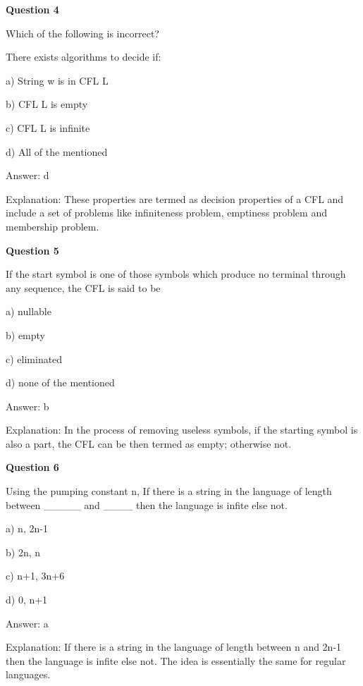 \documentclass{article}
\begin{document}
\begin{mdframed}[linewidth=1pt, roundcorner=5pt, linecolor=gray!30, backgroundcolor=gray!5]
\textbf{Question 4} 

Which of the following is incorrect?

There exists algorithms to decide if:

a) String w is in CFL L

b) CFL L is empty

c) CFL L is infinite

d) All of the mentioned
\vspace{5pt} \par
\begin{tcolorbox}[colback=green!5, colframe=green!40!black, title=Solution]
Answer: d

Explanation: These properties are termed as decision properties of a CFL and include a set of problems like infiniteness problem, emptiness problem and membership problem.
\end{tcolorbox}
\end{mdframed}

\begin{mdframed}[linewidth=1pt, roundcorner=5pt, linecolor=gray!30, backgroundcolor=gray!5]
\textbf{Question 5} 

If the start symbol is one of those symbols which produce no terminal through any sequence, the CFL is said to be

a) nullable

b) empty

c) eliminated

d) none of the mentioned
\vspace{5pt} \par
\begin{tcolorbox}[colback=green!5, colframe=green!40!black, title=Solution]
Answer: b

Explanation: In the process of removing useless symbols, if the starting symbol is also a part, the CFL can be then termed as empty; otherwise not.
\end{tcolorbox}
\end{mdframed}

\begin{mdframed}[linewidth=1pt, roundcorner=5pt, linecolor=gray!30, backgroundcolor=gray!5]
\textbf{Question 6} 

Using the pumping constant n, If there is a string in the language of length between \_\_\_\_\_ and \_\_\_\_ then the language is infite else not.

a) n, 2n-1

b) 2n, n

c) n+1, 3n+6

d) 0, n+1
\vspace{5pt} \par
\begin{tcolorbox}[colback=green!5, colframe=green!40!black, title=Solution]
Answer: a

Explanation: If there is a string in the language of length between n and 2n-1 then the language is infite else not. The idea is essentially the same for regular languages.
\end{tcolorbox}
\end{mdframed}
\newpage
\end{document}
